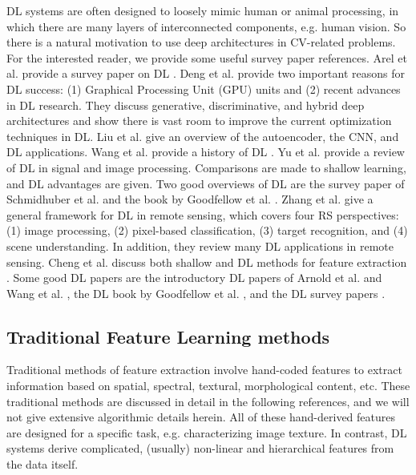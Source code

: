 \documentclass[12pt]{spieman}
\begin{document}
\begin{spacing}{1}
DL systems are often designed to loosely mimic human or animal processing, in which there are many layers of interconnected components, e.g. human vision. So there is a natural motivation to use deep architectures in CV-related problems. For the interested reader, we provide some useful survey paper references. Arel et al. provide a survey paper on DL \cite{Arel2010} . Deng et al. \cite{Deng2014} provide two important reasons for DL success: (1) Graphical Processing Unit (GPU) units and (2) recent advances in DL research. They discuss generative, discriminative, and hybrid deep architectures and show there is vast room to improve the current optimization techniques in DL. Liu et al. \cite{liu2016survey} give an overview of the autoencoder, the CNN, and DL applications. Wang et al. provide a history of DL \cite{wang2015survey} . Yu et al. \cite{Yu2011} provide a review of DL in signal and image processing. Comparisons are made to shallow learning, and DL advantages are given. Two good overviews of DL are the survey paper of Schmidhuber et al. \cite{Schmidhuber2015} and the book by Goodfellow et al. \cite{goodfellow2016deep}. Zhang et al. \cite{Zhang2016} give a general framework for DL in remote sensing, which covers four RS perspectives: (1) image processing, (2) pixel-based classification, (3) target recognition, and (4) scene understanding. In addition, they review many DL applications in remote sensing. Cheng et al. discuss both shallow and DL methods for feature extraction \cite{Cheng}. Some good DL papers are the introductory DL papers of Arnold et al. \cite{Arnold2012Introduction} and Wang et al. \cite{wang2015survey} , the DL book by Goodfellow et al. \cite{goodfellow2016deep} , and the DL survey papers \cite{Schmidhuber2015, bengio2012unsupervised, Chen2014, Deng2013Deep, Deng2014, liu2016survey, Najafabadi2015Deep, wang2015survey, Wan2014Deep} .

\subsection{Traditional Feature Learning methods}
Traditional methods of feature extraction involve hand-coded features to extract information based on spatial, spectral, textural, morphological content, etc. These traditional methods are discussed in detail in the following references, and we will not give extensive algorithmic details herein. All of these hand-derived features are designed for a specific task, e.g. characterizing image texture. In contrast, DL systems derive complicated, (usually) non-linear and hierarchical features from the data itself. 


\end{spacing}
\end{document}
